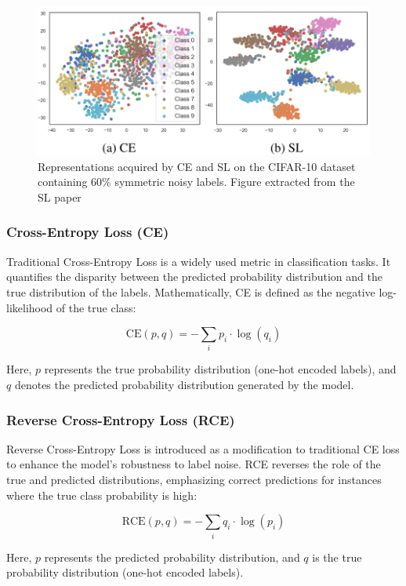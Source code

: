 \documentclass[11pt,twocolumn,letterpaper]{article}
\begin{document}
\begin{figure}[ht]
    \centering
    \includegraphics[width=1\linewidth]{SCESeparation.png}
    \caption{Representations acquired by CE and SL on the CIFAR-10 dataset containing 60\% symmetric noisy labels. Figure extracted from the SL paper \cite{wangSymmetricCrossEntropy2019}}
    \label{fig:SL}
\end{figure}
\subsubsection*{Cross-Entropy Loss (CE)}

Traditional Cross-Entropy Loss is a widely used metric in classification tasks. It quantifies the disparity between the predicted probability distribution and the true distribution of the labels. Mathematically, CE is defined as the negative log-likelihood of the true class:

\[
\text{CE}(p, q) = -\sum_{i} p_i \cdot \log(q_i)
\]

Here, \( p \) represents the true probability distribution (one-hot encoded labels), and \( q \) denotes the predicted probability distribution generated by the model.

\subsubsection*{Reverse Cross-Entropy Loss (RCE)}

Reverse Cross-Entropy Loss is introduced as a modification to traditional CE loss to enhance the model's robustness to label noise. RCE reverses the role of the true and predicted distributions, emphasizing correct predictions for instances where the true class probability is high:

\[
\text{RCE}(p, q) = -\sum_{i} q_i \cdot \log(p_i)
\]

Here, \( p \) represents the predicted probability distribution, and \( q \) is the true probability distribution (one-hot encoded labels).
\end{document}
